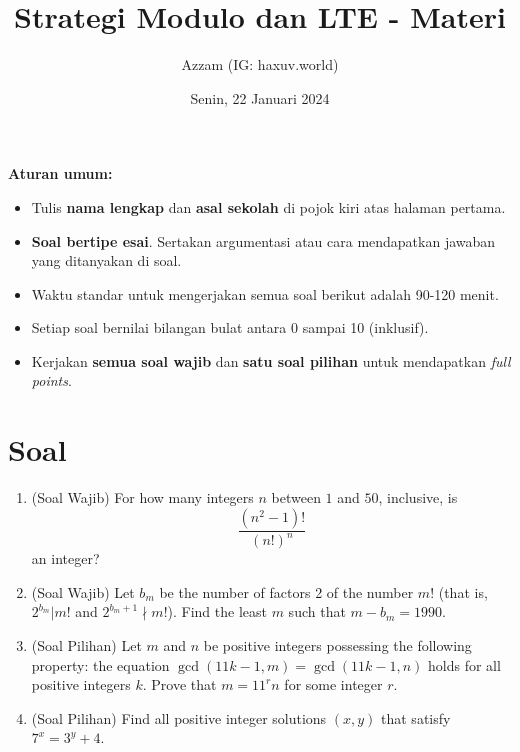 \documentclass[12pt]{scrartcl}
\title{Strategi Modulo dan LTE - Materi}
\author{Azzam (IG: haxuv.world)}
\date{Senin, 22 Januari 2024}
\begin{document}
\maketitle

\renewcommand*\contentsname{Daftar Isi}
\tableofcontents

\newpage
\textbf{Aturan umum:}
\begin{itemize}
    \item Tulis \textbf{nama lengkap} dan \textbf{asal sekolah} di pojok kiri atas halaman pertama.
    \item \textbf{Soal bertipe esai}. Sertakan argumentasi atau cara mendapatkan jawaban yang ditanyakan di soal.
    \item Waktu standar untuk mengerjakan semua soal berikut adalah 90-120 menit.
    \item Setiap soal bernilai bilangan bulat antara 0 sampai 10 (inklusif).
    \item Kerjakan \textbf{semua soal wajib} dan \textbf{satu soal pilihan} untuk mendapatkan \textit{full points}.
\end{itemize}


\section{Soal}
\begin{enumerate}
    \item (Soal Wajib) For how many integers $n$ between $1$ and $50$, inclusive, is\[\frac{(n^2-1)!}{(n!)^n}\]an integer?

    \item (Soal Wajib) Let $b_m$ be the number of factors 2 of the number $m!$ (that is, $2^{b_m}|m!$ and $2^{b_m+1} \nmid m!$). Find the least $m$ such that $m - b_m = 1990$.
    
    \item (Soal Pilihan) Let $m$ and $n$ be positive integers possessing the following property: the equation $\gcd(11k - 1, m) = \gcd(11k - 1, n)$ holds for all positive integers $k$. Prove that $m = 11^{r}n$ for some integer $r$.
    
    \item (Soal Pilihan) Find all positive integer solutions $(x,y)$ that satisfy $7^x=3^y+4$.
\end{enumerate}
\end{document}

